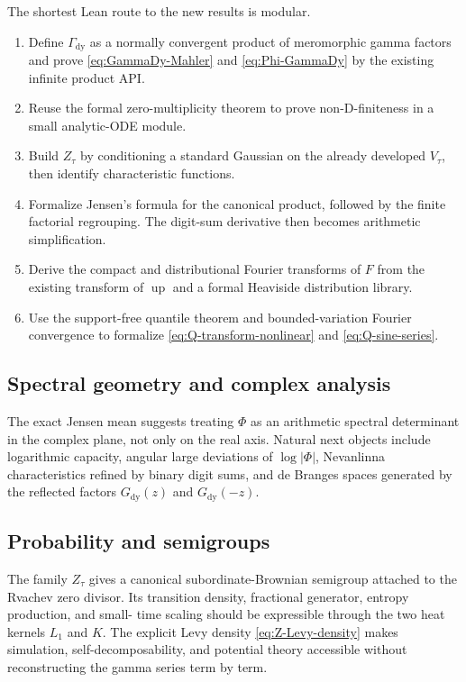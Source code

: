 \documentclass[11pt,oneside]{article}
\theoremstyle{definition}
\theoremstyle{remark}
\newcommand{\Up}{\operatorname{up}}
\newcommand{\GammaDy}{\Gamma_{\!\mathrm{dy}}}
\begin{document}
The shortest Lean route to the new results is modular.
\begin{enumerate}[leftmargin=2.3em]
\item Define $\GammaDy$ as a normally convergent product of meromorphic gamma factors and
      prove \eqref{eq:GammaDy-Mahler} and \eqref{eq:Phi-GammaDy} by the existing infinite
      product API.
\item Reuse the formal zero-multiplicity theorem to prove non-D-finiteness in a small
      analytic-ODE module.
\item Build $Z_\tau$ by conditioning a standard Gaussian on the already developed
      $V_\tau$, then identify characteristic functions.
\item Formalize Jensen's formula for the canonical product, followed by the finite factorial
      regrouping.  The digit-sum derivative then becomes arithmetic simplification.
\item Derive the compact and distributional Fourier transforms of $F$ from the existing
      transform of $\Up$ and a formal Heaviside distribution library.
\item Use the support-free quantile theorem and bounded-variation Fourier convergence to
      formalize \eqref{eq:Q-transform-nonlinear} and \eqref{eq:Q-sine-series}.
\end{enumerate}

\subsection{Spectral geometry and complex analysis}

The exact Jensen mean suggests treating $\Phi$ as an arithmetic spectral determinant in the
complex plane, not only on the real axis.  Natural next objects include logarithmic capacity,
angular large deviations of $\log|\Phi|$, Nevanlinna characteristics refined by binary digit
sums, and de Branges spaces generated by the reflected factors
$G_{\mathrm{dy}}(z)$ and $G_{\mathrm{dy}}(-z)$.

\subsection{Probability and semigroups}

The family $Z_\tau$ gives a canonical subordinate-Brownian semigroup attached to the Rvachev
zero divisor.  Its transition density, fractional generator, entropy production, and small-
time scaling should be expressible through the two heat kernels $L_1$ and $K$.  The explicit
Levy density \eqref{eq:Z-Levy-density} makes simulation, self-decomposability, and potential
theory accessible without reconstructing the gamma series term by term.
\end{document}
